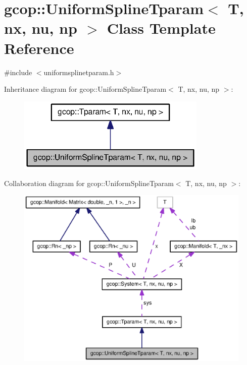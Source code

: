 \section{gcop\-:\-:\-Uniform\-Spline\-Tparam$<$ \-T, nx, nu, np $>$ \-Class \-Template \-Reference}
\label{classgcop_1_1UniformSplineTparam}


{\ttfamily \#include $<$uniformsplinetparam.\-h$>$}



\-Inheritance diagram for gcop\-:\-:\-Uniform\-Spline\-Tparam$<$ \-T, nx, nu, np $>$\-:
\nopagebreak
\begin{figure}[H]
\begin{center}
\leavevmode
\includegraphics[width=256pt]{classgcop_1_1UniformSplineTparam__inherit__graph}
\end{center}
\end{figure}


\-Collaboration diagram for gcop\-:\-:\-Uniform\-Spline\-Tparam$<$ \-T, nx, nu, np $>$\-:
\nopagebreak
\begin{figure}[H]
\begin{center}
\leavevmode
\includegraphics[width=350pt]{classgcop_1_1UniformSplineTparam__coll__graph}
\end{center}
\end{figure}
